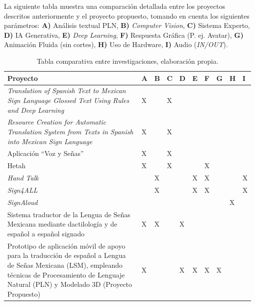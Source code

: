 \newpage
La siguiente tabla muestra una comparación detallada entre los proyectos descritos anteriormente y el proyecto propuesto, tomando en cuenta los siguientes parámetros: \textbf{A)} Análisis textual PLN, \textbf{B)} \textit{Computer Vision}, \textbf{C)} Sistema Experto, \textbf{D)} IA Generativa, \textbf{E)} \textit{Deep Learning}, \textbf{F)} Respuesta Gráfica (P. ej. Avatar), \textbf{G)} Animación Fluida (sin cortes), \textbf{H)} Uso de Hardware, \textbf{I)} Audio (\textit{IN/OUT}).

\begin{table}[H]
    \centering
    \begin{tabular}{|p{6cm}|p{0.5cm}|p{0.5cm}|p{0.5cm}|p{0.5cm}|p{0.5cm}|p{0.5cm}|p{0.5cm}|p{0.5cm}|p{0.5cm}|}
        \hline
        \textbf{Proyecto} & \textbf{A} & \textbf{B} & \textbf{C} & \textbf{D} & \textbf{E} & \textbf{F} & \textbf{G} & \textbf{H} & \textbf{I}\\
        \hline
        \textit{Translation of Spanish Text to Mexican Sign Language Glossed Text Using Rules and Deep Learning} & X &  & X &  &  &  &  &  &\\
        \hline
        \textit{Resource Creation for Automatic Translation System from Texts in Spanish into Mexican Sign Language} & X &  & X &  &  &  &  &  &\\
        \hline
        Aplicación “Voz y Señas” & X &  & X &  &  &  &  &  &\\
        \hline
        Hetah & X &  & X &  &  & X &  &  &\\
        \hline
        \textit{Hand Talk} &  & X &  &  & X & X &  &  & X\\
        \hline
        \textit{Sign4ALL} &  & X &  &  & X & X &  &  & X\\
        \hline
        \textit{SignAloud} &  &  &  &  &  &  &  & X & \\
        \hline
        Sistema traductor de la Lengua de Señas Mexicana mediante dactilología y de español a español signado & X & X &  & X &  &  &  &  & \\
        \hline
        Prototipo de aplicación móvil de apoyo para la traducción de español a Lengua de Señas Mexicana (LSM), empleando técnicas de Procesamiento de Lenguaje Natural (PLN) y Modelado 3D (Proyecto Propuesto) & X &  &  & X & X & X & X &  & \\
        \hline
    \end{tabular}
    \caption[Tabla comparativa entre investigaciones]{Tabla comparativa entre investigaciones, elaboración propia.}
    \label{tabla:edo_arte}
\end{table}

